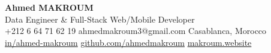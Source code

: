 \documentclass[10pt,a4paper,sans]{moderncv}
\begin{document}
\begin{center}
    {\fontsize{20}{22}\selectfont\textbf{Ahmed MAKROUM}}\\[0.5em]
    {\fontsize{13.2}{15.4}\selectfont Data Engineer \& Full-Stack Web/Mobile Developer} \\[0.4em]
    {\fontsize{10.5}{12.3}\selectfont
        \faMobile\enspace +212 6 64 71 62 19 \quad
        \faEnvelope\enspace ahmedmakroum3@gmail.com \quad
        \faHome\enspace Casablanca, Morocco \\[0.3em]
        \faLinkedin\enspace \href{https://www.linkedin.com/in/ahmed-makroum/}{in/ahmed-makroum} \quad
        \faGithub\enspace \href{https://github.com/ahmedmakroum}{github.com/ahmedmakroum} \quad
        \faGlobe\enspace \href{https://makroum.website}{makroum.website}
    }\\[0.5em]
\end{center}
\vspace{-25pt}


\end{document}
